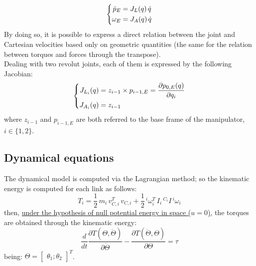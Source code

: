 \documentclass[main.tex]{subfiles}
\begin{document}
\begin{equation}
    \centering
    \left\{\begin{split} 
      \dot{p}_E &= J_L(q)\,\dot{q}  \\
      \omega_E &= J_A(q)\,\dot{q}
      \end{split}\right.
\end{equation}
\break
By doing so, it is possible to express a direct relation between the joint and Cartesian velocities based only on geometric quantities (the same for the  relation between torques and forces through the transpose). \\Dealing with two revolut joints, each of them is expressed by the following Jacobian:
\begin{equation}
    \centering
    \left\{\begin{split} 
     J_{L_i}(q) &=  z_{i-1}\times{p_{i-1,E}} = \dfrac{\partial{p_{0,E}(q)}}{\partial{q_i}} \\
     J_{A_i}(q) &= z_{i-1}
     \end{split}\right.
\end{equation}
where $z_{i-1}$ and $p_{i-1,E}$ are both referred to the base frame of the manipulator, $i \in \{1,2\}$.\\






\subsection{Dynamical equations}
The dynamical model is computed via the Lagrangian method; so the kinematic energy is computed for each link as follows:
$$T_i = \frac{1}{2}\,m_i\,v_{C,i}^T\,v_{C,i} + \frac{1}{2}\,^{i}\omega_i^{T}\,I_i\,^{C_i}I\,^{i}\omega_{i}$$
then, \underline{under the hypothesis of null potential energy in space ($u=0$)}, the torques are obtained through the kinematic energy:
$$\dfrac{d}{dt}\dfrac{\partial{T(\Theta,\dot{\Theta})}}{\partial{\dot{\Theta}}}-\dfrac{\partial{T(\dot{\Theta},\Theta)}}{\partial{\Theta}}=\tau$$
being: 
$\Theta = \begin{bmatrix} \theta_1;\theta_2\end{bmatrix}^{T}$.\\
\end{document}
